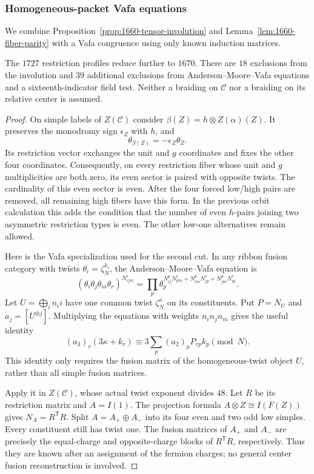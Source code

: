 \subsubsection{Homogeneous-packet Vafa equations}

We combine Proposition~\ref{prop:1660-tensor-involution} and
Lemma~\ref{lem:1660-fiber-parity} with a Vafa congruence using only
known induction matrices.

\begin{proposition}
The $1727$ restriction profiles reduce further to $1670$.
There are $18$ exclusions from the involution and $39$ additional exclusions
from Anderson--Moore--Vafa equations and a sixteenth-indicator field test.
Neither a braiding on $\mathcal C$ nor a braiding on its relative center
is assumed.
\end{proposition}
\begin{proof}
On simple labels of $Z(\mathcal C)$ consider
$\beta(Z)=h\otimes Z(\alpha)(Z)$. It preserves the monodromy sign
$\epsilon_Z$ with $h$, and
\[
 \theta_{\beta(Z)}=-\epsilon_Z\theta_Z.
\]
Its restriction vector exchanges the unit and $g$ coordinates and fixes
the other four coordinates. Consequently, on every restriction fiber
whose unit and $g$ multiplicities are both zero, its even sector is paired
with opposite twists. The cardinality of this even sector is even.
After the four forced low/high pairs are removed, all remaining high
fibers have this form. In the previous orbit calculation this adds the
condition that the number of even $h$-pairs joining two asymmetric
restriction types is even. The other low-one alternatives remain allowed.

Here is the Vafa specialization used for the second cut. In any ribbon
fusion category with twists $\theta_i=\zeta_N^{k_i}$, the
Anderson--Moore--Vafa equation \cite[Theorem~8.18.1]{EGNO} is
\[
 (\theta_i\theta_j\theta_m\theta_r)^{N_{ijm}^{r}}
 =\prod_p\theta_p^{N_{ij}^{p}N_{pm}^{r}
                     +N_{im}^{p}N_{jp}^{r}
                     +N_{jm}^{p}N_{ip}^{r}}.
\]
Let $U=\bigoplus_i n_i i$ have one common twist
$\zeta_N^\kappa$ on its constituents. Put $P=N_U$ and
$a_j=[U^{\otimes j}]$. Multiplying the equations with weights
$n_i n_j n_m$ gives the useful identity
\[
 (a_3)_r(3\kappa+k_r)
     \equiv3\sum_p (a_2)_p P_{rp}k_p\pmod N.             \tag{V}
\]
This identity only requires the fusion matrix of the homogeneous-twist
object $U$, rather than all simple fusion matrices.

Apply it in $Z(\mathcal C)$, whose actual twist exponent divides $48$.
Let $R$ be its restriction matrix and $A=I(1)$.
The projection formula $A\otimes Z\cong I(F(Z))$ gives
$N_A=R^{\mathsf T}R$. Split $A=A_+\oplus A_-$ into its four even and two
odd low simples. Every constituent still has twist one. The fusion matrices
of $A_+$ and $A_-$ are precisely the equal-charge and opposite-charge
blocks of $R^{\mathsf T}R$, respectively. Thus they are known after an
assignment of the fermion charges; no general center fusion reconstruction
is involved.


\end{proof}
